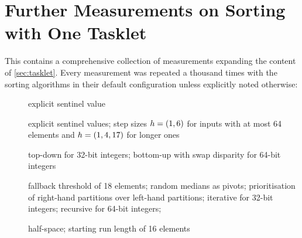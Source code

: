 \chapter{Further Measurements on Sorting with One Tasklet}
\label{apx:tasklet}

This  contains a comprehensive collection of measurements expanding the content of \cref{sec:tasklet}.
Every measurement was repeated a thousand times with the sorting algorithms in their default configuration unless explicitly noted otherwise:
\begin{description}
	\item[\IS{}]
	explicit sentinel value

	\item[\ShS{}]
	explicit sentinel values;
	step sizes \(h = (1, 6)\) for inputs with at most 64 elements and \(h = (1, 4, 17)\) for longer ones

	\item[\HS{}]
	top-down for 32-bit integers;
	bottom-up with swap disparity for 64-bit integers

	\item[\QS{}]
	fallback threshold of 18 elements;
	random medians as pivots;
	prioritisation of right-hand partitions over left-hand partitions;
	iterative for 32-bit integers;
	recursive for 64-bit integers;

	\item[\MS{}]
	half-space;
	starting run length of 16 elements
\end{description}

\clearpage


\clearpage


\clearpage


\clearpage


\clearpage


